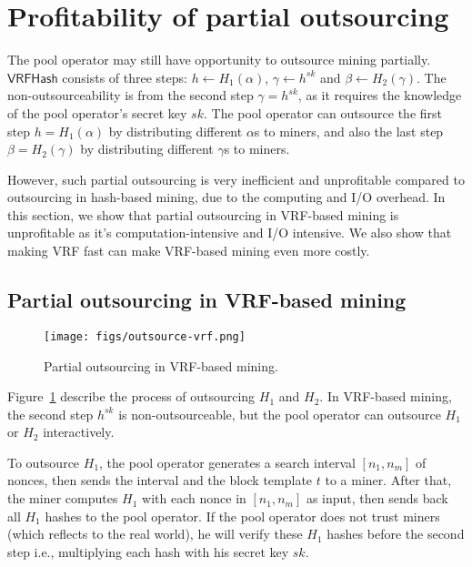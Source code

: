 \section{Profitability of partial outsourcing}
\label{sec:partial-outsourcing}

The pool operator may still have opportunity to outsource mining partially.
$\mathsf{VRFHash}$ consists of three steps: $h \gets H_1(\alpha)$, $\gamma \gets h^{sk}$ and $\beta \gets H_2(\gamma)$.
The non-outsourceability is from the second step $\gamma = h^{sk}$, as it requires the knowledge of the pool operator's secret key $sk$.
The pool operator can outsource the first step $h = H_1(\alpha)$ by distributing different $\alpha$s to miners, and also the last step $\beta = H_2(\gamma)$ by distributing different $\gamma$s to miners.

However, such partial outsourcing is very inefficient and unprofitable compared to outsourcing in hash-based mining, due to the computing and I/O overhead.
In this section, we show that partial outsourcing in VRF-based mining is unprofitable as it's computation-intensive and I/O intensive.
We also show that making VRF fast can make VRF-based mining even more costly.

\subsection{Partial outsourcing in VRF-based mining}

\begin{figure}[htp]
    \centering
    \texttt{[image: figs/outsource-vrf.png]}
    \caption{Partial outsourcing in VRF-based mining.}
    \label{fig:outsource-vrf}
\end{figure}

Figure~\ref{fig:outsource-vrf} describe the process of outsourcing $H_1$ and $H_2$.
In VRF-based mining, the second step $h^{sk}$ is non-outsourceable, but the pool operator can outsource $H_1$ or $H_2$ interactively.

To outsource $H_1$, the pool operator generates a search interval $[n_1, n_m]$ of nonces, then sends the interval and the block template $t$ to a miner.
After that, the miner computes $H_1$ with each nonce in $[n_1, n_m]$ as input, then sends back all $H_1$ hashes to the pool operator.
If the pool operator does not trust miners (which reflects to the real world), he will verify these $H_1$ hashes before the second step i.e., multiplying each hash with his secret key $sk$.

